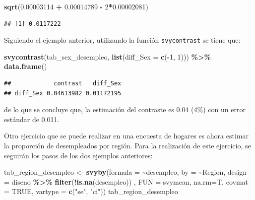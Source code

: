 \documentclass[
  12pt,
]{book}
\newenvironment{Shaded}{\begin{snugshade}}{\end{snugshade}}
\newcommand{\AttributeTok}[1]{\textcolor[rgb]{0.13,0.29,0.53}{#1}}
\newcommand{\ConstantTok}[1]{\textcolor[rgb]{0.56,0.35,0.01}{#1}}
\newcommand{\DecValTok}[1]{\textcolor[rgb]{0.00,0.00,0.81}{#1}}
\newcommand{\FloatTok}[1]{\textcolor[rgb]{0.00,0.00,0.81}{#1}}
\newcommand{\FunctionTok}[1]{\textcolor[rgb]{0.13,0.29,0.53}{\textbf{#1}}}
\newcommand{\NormalTok}[1]{#1}
\newcommand{\OtherTok}[1]{\textcolor[rgb]{0.56,0.35,0.01}{#1}}
\newcommand{\SpecialCharTok}[1]{\textcolor[rgb]{0.81,0.36,0.00}{\textbf{#1}}}
\newcommand{\StringTok}[1]{\textcolor[rgb]{0.31,0.60,0.02}{#1}}
\begin{document}
\begin{Shaded}
\begin{Highlighting}[]
\FunctionTok{sqrt}\NormalTok{(}\FloatTok{0.00003114}  \SpecialCharTok{+} \FloatTok{0.00014789} \SpecialCharTok{{-}} \DecValTok{2}\SpecialCharTok{*}\FloatTok{0.00002081}\NormalTok{)}
\end{Highlighting}
\end{Shaded}

\begin{verbatim}
## [1] 0.0117222
\end{verbatim}

Siguiendo el ejemplo anterior, utilizando la función \texttt{svycontrast} se tiene que:

\begin{Shaded}
\begin{Highlighting}[]
\FunctionTok{svycontrast}\NormalTok{(tab\_sex\_desempleo,}
            \FunctionTok{list}\NormalTok{(}\AttributeTok{diff\_Sex =} \FunctionTok{c}\NormalTok{(}\SpecialCharTok{{-}}\DecValTok{1}\NormalTok{, }\DecValTok{1}\NormalTok{))) }\SpecialCharTok{\%\textgreater{}\%}
  \FunctionTok{data.frame}\NormalTok{()}
\end{Highlighting}
\end{Shaded}

\begin{verbatim}
##            contrast   diff_Sex
## diff_Sex 0.04613982 0.01172195
\end{verbatim}

de lo que se concluye que, la estimación del contraste es 0.04 (4\%) con un error estándar de 0.011.

Otro ejercicio que se puede realizar en una encuesta de hogares es ahora estimar la proporción de desempleados por región. Para la realización de este ejercicio, se seguirán los pasos de los dos ejemplos anteriores:

\begin{Shaded}
\begin{Highlighting}[]
\NormalTok{tab\_region\_desempleo }\OtherTok{\textless{}{-}} \FunctionTok{svyby}\NormalTok{(}\AttributeTok{formula =}  \SpecialCharTok{\textasciitilde{}}\NormalTok{desempleo, }\AttributeTok{by =} \SpecialCharTok{\textasciitilde{}}\NormalTok{Region, }
                              \AttributeTok{design  =}\NormalTok{ diseno }\SpecialCharTok{\%\textgreater{}\%} \FunctionTok{filter}\NormalTok{(}\SpecialCharTok{!}\FunctionTok{is.na}\NormalTok{(desempleo)) , }
                              \AttributeTok{FUN     =}\NormalTok{ svymean, }\AttributeTok{na.rm=}\NormalTok{T, }\AttributeTok{covmat =} \ConstantTok{TRUE}\NormalTok{,}
                              \AttributeTok{vartype =} \FunctionTok{c}\NormalTok{(}\StringTok{"se"}\NormalTok{, }\StringTok{"ci"}\NormalTok{))}
\NormalTok{tab\_region\_desempleo}
\end{Highlighting}
\end{Shaded}
\end{document}
